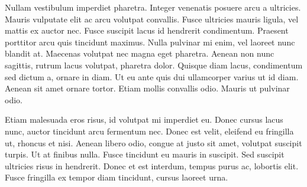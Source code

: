 Nullam vestibulum imperdiet pharetra. Integer venenatis posuere arcu a ultricies. Mauris vulputate elit ac arcu volutpat convallis. Fusce ultricies mauris ligula, vel mattis ex auctor nec. Fusce suscipit lacus id hendrerit condimentum. Praesent porttitor arcu quis tincidunt maximus. Nulla pulvinar mi enim, vel laoreet nunc blandit at. Maecenas volutpat nec magna eget pharetra. Aenean non nunc sagittis, rutrum lacus volutpat, pharetra dolor. Quisque diam lacus, condimentum sed dictum a, ornare in diam. Ut eu ante quis dui ullamcorper varius ut id diam. Aenean sit amet ornare tortor. Etiam mollis convallis odio. Mauris ut pulvinar odio.

Etiam malesuada eros risus, id volutpat mi imperdiet eu. Donec cursus lacus nunc, auctor tincidunt arcu fermentum nec. Donec est velit, eleifend eu fringilla ut, rhoncus et nisi. Aenean libero odio, congue at justo sit amet, volutpat suscipit turpis. Ut at finibus nulla. Fusce tincidunt eu mauris in suscipit. Sed suscipit ultricies risus in hendrerit. Donec et est interdum, tempus purus ac, lobortis elit. Fusce fringilla ex tempor diam tincidunt, cursus laoreet urna.